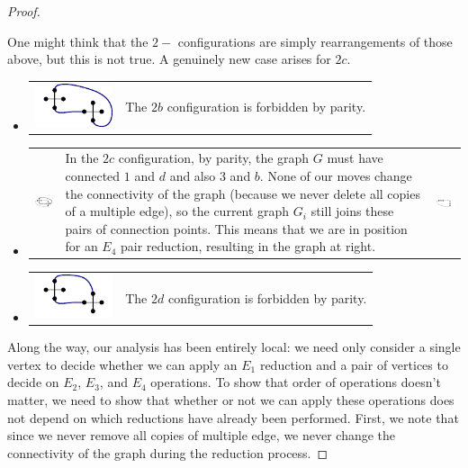 \documentclass[amsmath,secnumarabic,floatfix,amssymb,nofootinbib,nobibnotes,letterpaper,11pt,tightenlines,showkeys]{revtex4}
\theoremstyle{definition}
\newcommand{\loopinsert}{E_1}
\newcommand{\edgedouble}{E_2}
\newcommand{\cutedgedouble}{E_3}
\newcommand{\pairinsert}{E_4}
\begin{document}
\begin{proof}
\begin{itemize}
\end{itemize}
One might think that the $2-$ configurations are simply rearrangements of those above, but this is not true. A genuinely new case arises for $2c$.
\begin{itemize}
\item
\begin{tabular}{m{1in}m{3in}}
\includegraphics[width=0.9in]{2-b-configuration.pdf}
&
The $2b$ configuration is forbidden by parity.
\end{tabular}
\item
\begin{tabular}{m{1in}m{3in}m{1in}}
\includegraphics[width=.9in]{2-c-configuration.pdf}
&
In the $2c$ configuration, by parity, the graph $G$ must have connected $1$ and $d$ and also $3$ and $b$. None of our moves change the connectivity of the graph (because we never delete all copies of a multiple edge), so the current graph $G_i$ still joins these pairs of connection points. This means that we are in position for an $\pairinsert$ pair reduction, resulting in the graph at right.
&
\includegraphics[width=.9in]{2-c-target.pdf}
\end{tabular}
\item
\begin{tabular}{m{1in}m{3in}}
\includegraphics[width=0.9in]{2-d-configuration.pdf}
&
The $2d$ configuration is forbidden by parity.
\end{tabular}
\end{itemize}
Along the way, our analysis has been entirely local: we need only consider a single vertex to decide whether we can apply an $\loopinsert$ reduction and a pair of vertices to decide on $\edgedouble$, $\cutedgedouble$, and $\pairinsert$ operations. To show that order of operations doesn't matter, we need to show that whether or not we can apply these operations does not depend on which reductions have already been performed. First, we note that since we never remove all copies of multiple edge, we never change the connectivity of the graph during the reduction process.


\end{proof}
\end{document}
